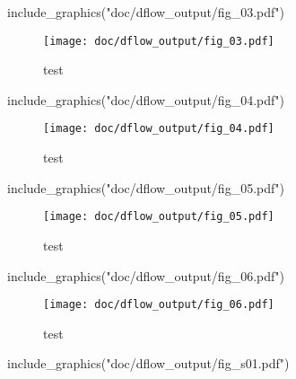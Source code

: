 \documentclass[
]{article}
\newenvironment{Shaded}{\begin{snugshade}}{\end{snugshade}}
\newcommand{\FunctionTok}[1]{\textcolor[rgb]{0.00,0.00,0.00}{#1}}
\newcommand{\NormalTok}[1]{#1}
\newcommand{\StringTok}[1]{\textcolor[rgb]{0.31,0.60,0.02}{#1}}
\begin{document}
\begin{Shaded}
\begin{Highlighting}[]
\FunctionTok{include\_graphics}\NormalTok{(}\StringTok{"doc/dflow\_output/fig\_03.pdf"}\NormalTok{)}
\end{Highlighting}
\end{Shaded}

\begin{figure}
\centering
\texttt{[image: doc/dflow\_output/fig\_03.pdf]}
\caption{test}
\end{figure}

\begin{Shaded}
\begin{Highlighting}[]
\FunctionTok{include\_graphics}\NormalTok{(}\StringTok{"doc/dflow\_output/fig\_04.pdf"}\NormalTok{)}
\end{Highlighting}
\end{Shaded}

\begin{figure}
\centering
\texttt{[image: doc/dflow\_output/fig\_04.pdf]}
\caption{test}
\end{figure}

\begin{Shaded}
\begin{Highlighting}[]
\FunctionTok{include\_graphics}\NormalTok{(}\StringTok{"doc/dflow\_output/fig\_05.pdf"}\NormalTok{)}
\end{Highlighting}
\end{Shaded}

\begin{figure}
\centering
\texttt{[image: doc/dflow\_output/fig\_05.pdf]}
\caption{test}
\end{figure}

\begin{Shaded}
\begin{Highlighting}[]
\FunctionTok{include\_graphics}\NormalTok{(}\StringTok{"doc/dflow\_output/fig\_06.pdf"}\NormalTok{)}
\end{Highlighting}
\end{Shaded}

\begin{figure}
\centering
\texttt{[image: doc/dflow\_output/fig\_06.pdf]}
\caption{test}
\end{figure}

\begin{Shaded}
\begin{Highlighting}[]
\FunctionTok{include\_graphics}\NormalTok{(}\StringTok{"doc/dflow\_output/fig\_s01.pdf"}\NormalTok{)}
\end{Highlighting}
\end{Shaded}
\end{document}
